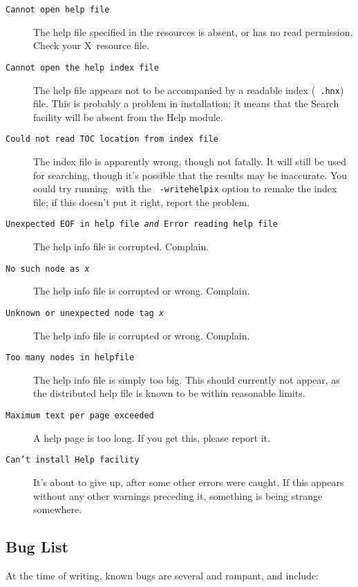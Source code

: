 \begin{description} \item[{\tt Cannot open help file}]\hskip
0.6pc\relax The help file specified in the resources is absent, or has
no read permission.  Check your X~resource file.

\item[{\tt Cannot open the help index file}]\hskip 0.6pc\relax The
help file appears not to be accompanied by a readable index ({\tt
.hnx}) file. This is probably a problem in installation; it means that
the Search facility will be absent from the Help module.

\item[{\tt Could not read TOC location from index file}]\hskip
0.6pc\relax The index file is apparently wrong, though not fatally.
It will still be used for searching, though it's possible that the
results may be inaccurate.  You could try running \xr\ with the {\tt
-writehelpix} option to remake the index file; if this doesn't put it
right, report the problem.

\item[{\tt Unexpected EOF in help file~{\it and\/} Error reading help
file}]\hskip 0.6pc\relax The help info file is corrupted.  Complain.

\item[{\tt No such node as~{\it x\/}}]\hskip 0.6pc\relax The help info
file is corrupted or wrong.  Complain.

\item[{\tt Unknown or unexpected node tag~{\it x\/}}]\hskip
0.6pc\relax The help info file is corrupted or wrong.  Complain.

\item[{\tt Too many nodes in helpfile}]\hskip 0.6pc\relax The help
info file is simply too big.  This should currently not appear, as the
distributed help file is known to be within reasonable limits.

\item[{\tt Maximum text per page exceeded}]\hskip 0.6pc\relax A help
page is too long.  If you get this, please report it.

\item[{\tt Can't install Help facility}]\hskip 0.6pc\relax It's about
to give up, after some other errors were caught.  If this appears
without any other warnings preceding it, something is being strange
somewhere.

\end{description}

\subsection{Bug List}
At the time of writing, known bugs are several and rampant, and
include:

